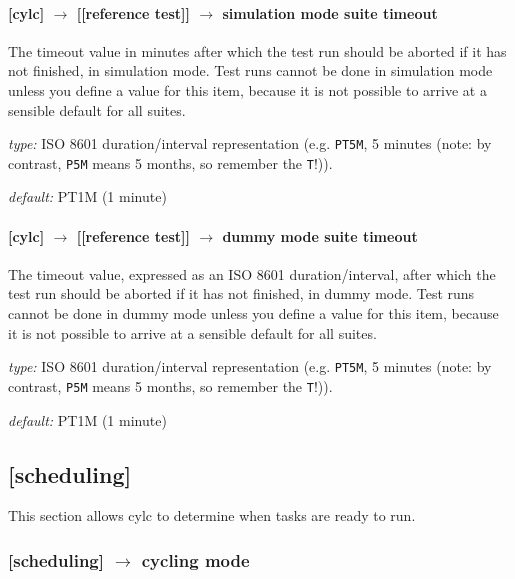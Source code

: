 \paragraph[simulation mode suite timeout]{[cylc] $\rightarrow$ [[reference test]] $\rightarrow$ simulation mode suite timeout}

The timeout value in minutes after which the test run should be aborted
if it has not finished, in simulation mode. Test runs cannot be done in
simulation mode unless you define a value for this item, because it is
not possible to arrive at a sensible default for all suites.

\begin{myitemize}
    \item {\em type:} ISO 8601 duration/interval representation (e.g.
 \lstinline=PT5M=, 5 minutes (note: by contrast, \lstinline=P5M= means 5
 months, so remember the \lstinline=T=!)).
    \item {\em default:} PT1M (1 minute)
\end{myitemize}

\paragraph[dummy mode suite timeout]{[cylc] $\rightarrow$ [[reference test]] $\rightarrow$ dummy mode suite timeout}

The timeout value, expressed as an ISO 8601 duration/interval, after which the
test run should be aborted if it has not finished, in dummy mode.  Test runs
cannot be done in dummy mode unless you define a value for this item, because
it is not possible to arrive at a sensible default for all suites.

\begin{myitemize}
    \item {\em type:} ISO 8601 duration/interval representation (e.g.
 \lstinline=PT5M=, 5 minutes (note: by contrast, \lstinline=P5M= means 5
 months, so remember the \lstinline=T=!)).
    \item {\em default:} PT1M (1 minute)
\end{myitemize}

\subsection{[scheduling]}

This section allows cylc to determine when tasks are ready to run.

\subsubsection[cycling]{ [scheduling] $\rightarrow$ cycling mode }
\label{cycling-mode}

